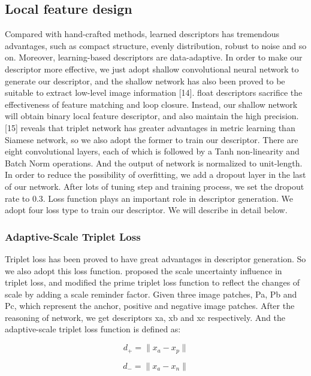 \documentclass[conference]{IEEEtran}
\begin{document}
\subsection{Local feature design } 
Compared with hand-crafted methods, learned descriptors has tremendous advantages, such as compact structure, evenly distribution, robust to noise and so on. Moreover, learning-based descriptors are data-adaptive. In order to make our descriptor more effective, we just adopt shallow convolutional neural network to generate our descriptor, and the shallow network has also been proved to be suitable to extract low-level image information [14]. float descriptors sacrifice the effectiveness of feature matching and loop closure. Instead, our shallow network will obtain binary local feature descriptor, and also maintain the high precision.
	[15] reveals that triplet network has greater advantages in metric learning than Siamese network, so we also adopt the former to train our descriptor. There are eight convolutional layers, each of which is followed by a Tanh non-linearity and Batch Norm operations. And the output of network is normalized to unit-length. In order to reduce the possibility of overfitting, we add a dropout layer in the last of our network. After lots of tuning step and training process, we set the dropout rate to 0.3.
	Loss function plays an important role in descriptor generation. We adopt four loss type to train our descriptor. We will describe in detail below.

\subsubsection{Adaptive-Scale Triplet Loss} 
Triplet loss has been proved to have great advantages in descriptor generation. So we also adopt this loss function. \cite{c28}proposed the scale uncertainty influence in triplet loss, and modified the prime triplet loss function to reflect the changes of scale by adding a scale reminder factor. Given three image patches, Pa, Pb and Pc, which represent the anchor, positive and negative image patches. After the reasoning of network, we get descriptors xa, xb and xc respectively. And the adaptive-scale triplet loss function is defined as:

\begin{equation}
d _{+} = \| x_{a} - x_{p}  \| 
\end{equation}

\begin{equation}
d _{-} = \| x_{a} - x_{n}  \| 
\end{equation}
\end{document}
